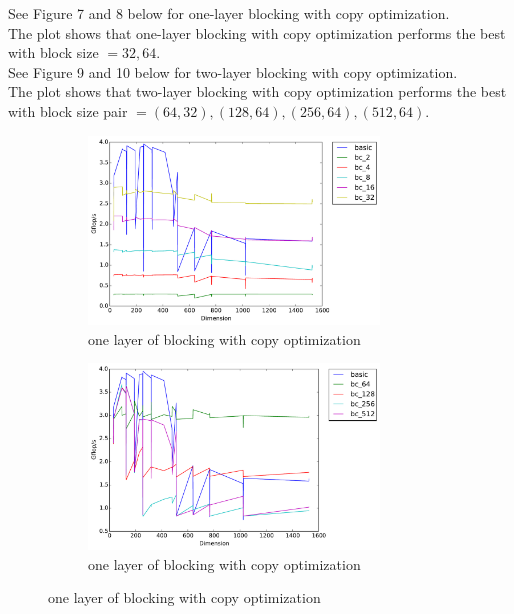 \documentclass[12pt]{article}
\numberwithin{equation}{section}
\begin{document}
See Figure 7 and 8 below for one-layer blocking with copy optimization.
\\
The plot shows that one-layer blocking with copy optimization performs the best with block size $= 32, 64$.
\\
See Figure 9 and 10 below for two-layer blocking with copy optimization.
\\
The plot shows that two-layer blocking with copy optimization performs the best with block size pair $= (64, 32), (128, 64), (256, 64), (512, 64)$.

\begin{figure}[!ht]
   \begin{subfigure}
      \centering
        \begin{center}
      \includegraphics[width=0.85\textwidth] {timing_bc_1}
        \end{center}
      \label{aload0}
      \caption{one layer of blocking with copy optimization}
  \end{subfigure}
  \begin{subfigure}
      \centering
        \begin{center}
      \includegraphics[width=0.85\textwidth] {timing_bc_2}
        \end{center}
      \label{aload1}
      \caption{one layer of blocking with copy optimization}
  \end{subfigure}

\end{figure}
\end{document}
